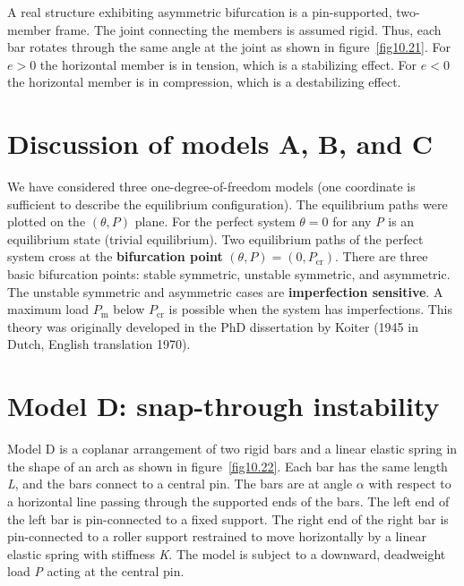 \documentclass{AeroStructure-ERJohnson}
\begin{document}
A real structure exhibiting asymmetric bifurcation is a pin-supported, two-member frame. The joint connecting the members is assumed rigid. Thus, each bar rotates through the same angle at the joint as shown in figure~\ref{fig10.21}. For $e>0$ the horizontal member is in tension, which is a stabilizing effect. For $e<0$ the horizontal member is in compression, which is a destabilizing effect.

\section{Discussion of models A, B, and C}\label{sec10.4}

\def\rightmark{Model D: snap-through instability}

We have considered three one-degree-of-freedom models (one coordinate is sufficient to describe the equilibrium configuration). The equilibrium paths were plotted on the $(\theta, P)$ plane. For the perfect system $\theta = 0$ for any \textit{P} is an equilibrium state (trivial equilibrium). Two equilibrium paths of the perfect system cross at the \textbf{bifurcation point} $(\theta, P)=\left(0, P_{\mathrm{cr}}\right)$. There are three basic bifurcation points: stable symmetric, unstable symmetric, and asymmetric. The unstable symmetric and asymmetric cases are \textbf{imperfection sensitive}. A maximum load $P_{\mathrm{m}}$ below $P_{\mathrm{cr}}$ is possible when the system has imperfections. This theory was originally developed in the PhD dissertation by Koiter (1945 in Dutch, English translation 1970).

\section{Model D: snap-through instability}\label{sec10.5}

Model D is a coplanar arrangement of two rigid bars and a linear elastic spring in the shape of an arch as shown in figure~\ref{fig10.22}. Each bar has the same length \textit{L}, and the bars connect to a central pin. The bars are at angle $\alpha$ with respect to a horizontal line passing through the supported ends of the bars. The left end of the left bar is pin-connected to a fixed support. The right end of the right bar is pin-connected to a roller support restrained to move horizontally by a linear elastic spring with stiffness \textit{K}. The model is subject to a downward, deadweight load \textit{P} acting at the central pin.

{\def\thefigure{10.22}
}
\end{document}
